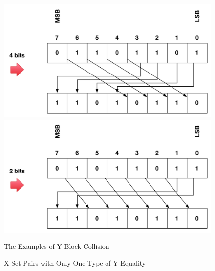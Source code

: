 \documentclass{article}
\begin{document}
\begin{figure}
{\begin{minipage}[b]{0.45\textwidth}
\includegraphics[width=1\textwidth]{./diagrams/r_d_4bits.pdf} \\
\includegraphics[width=1\textwidth]{./diagrams/r_d_2bits.pdf}
\end{minipage}
}
 \caption{The Examples of Y Block Collision}
 \label{fig:2 }
\end{figure}


\begin{figure}
\centering
{}
\caption{X Set Pairs with Only One Type of Y Equality}
 \label{fig:y_e_single} %
\end{figure}
\end{document}
